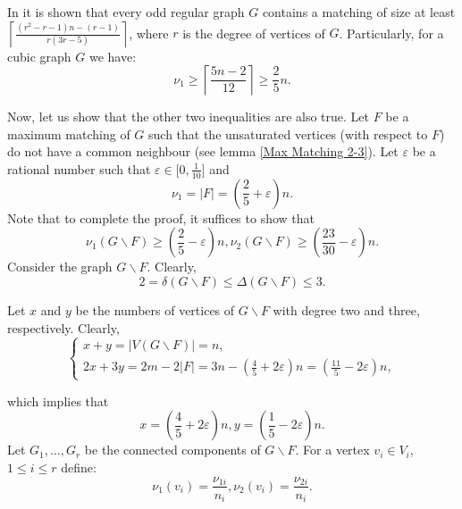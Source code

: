 \documentclass[fleqn,12pt,twoside]{article}
\newenvironment{proof}[1][Proof.]{\begin{trivlist}
\item[\hskip \labelsep {\bfseries #1}]}{\end{trivlist}}
\begin{document}
\begin{proof}
In \cite{Takao} it is shown that every odd regular graph $G$
contains a matching of size at least $\left\lceil \frac{(r^{2}-r-1)n
-(r-1)}{r(3r-5)}\right\rceil $, where $r$ is the degree of
vertices of $G$. Particularly, for a cubic graph $G$ we have:\begin{equation*}
\nu _{1}\geq \left\lceil \frac{5n -2}{12}\right\rceil \geq \frac{2}{5}n.
\end{equation*}

Now, let us show that the other two inequalities are also true. Let
$F$ be a
maximum matching of $G$ such that the unsaturated vertices (with respect to $F$) do not have a common neighbour (see lemma \ref{Max Matching 2-3}). Let $\varepsilon $ be a rational number such that $\varepsilon \in \lbrack 0,\frac{1}{10}]$ and
\begin{equation*}
\nu _{1}=\left\vert F\right\vert =(\frac{2}{5}+\varepsilon )n.
\end{equation*}Note that to complete the proof, it suffices to show that
\begin{equation*}
\nu _{1}(G\backslash F)\geq (\frac{2}{5}-\varepsilon )n,\nu
_{2}(G\backslash F)\geq (\frac{23}{30}-\varepsilon )n.
\end{equation*}Consider the graph $G\backslash F$. Clearly,
\begin{equation*}
2=\delta (G\backslash F)\leq \Delta (G\backslash F)\leq 3.
\end{equation*}

Let $x$ and $y$ be the numbers of vertices of $G\backslash F$ with
degree
two and three, respectively. Clearly,\begin{equation*}
\left\{
\begin{array}{l}
x+y=\left\vert V(G\backslash F)\right\vert =n , \\
2x+3y=2m -2\left\vert F\right\vert =3n -(\frac{4}{5}+2\varepsilon )n =(\frac{11}{5}-2\varepsilon )n ,\end{array}\right.
\end{equation*}

which implies that
\begin{equation*}
x=(\frac{4}{5}+2\varepsilon )n ,y=(\frac{1}{5}-2\varepsilon )n.
\end{equation*}Let $G_{1},...,G_{r}$ be the connected components of $G\backslash
F$. For a vertex $v_{i}\in V_{i}$, $1\leq i\leq r$ define:
\begin{equation*}
\nu _{1}(v_{i})=\frac{\nu _{1i}}{n_i },\nu _{2}(v_{i})=\frac{\nu
_{2i}}{n_i}.
\end{equation*}


\end{proof}
\end{document}
